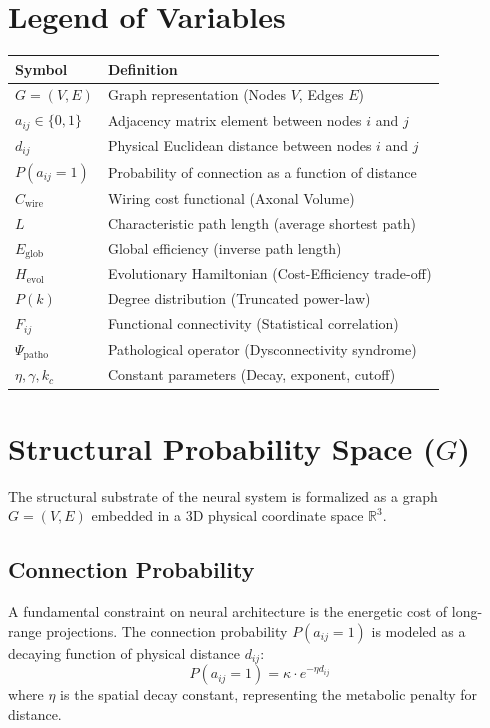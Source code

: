\documentclass[11pt,fleqn]{article}
\begin{document}
\section{Legend of Variables}
\begin{table}[H]
\centering
\begin{tabular}{ll}
\toprule
\textbf{Symbol} & \textbf{Definition} \\
\midrule
$G = (V, E)$ & Graph representation (Nodes $V$, Edges $E$) \\
$a_{ij} \in \{0, 1\}$ & Adjacency matrix element between nodes $i$ and $j$ \\
$d_{ij}$ & Physical Euclidean distance between nodes $i$ and $j$ \\
$P(a_{ij}=1)$ & Probability of connection as a function of distance \\
$C_{\text{wire}}$ & Wiring cost functional (Axonal Volume) \\
$L$ & Characteristic path length (average shortest path) \\
$E_{\text{glob}}$ & Global efficiency (inverse path length) \\
$H_{\text{evol}}$ & Evolutionary Hamiltonian (Cost-Efficiency trade-off) \\
$P(k)$ & Degree distribution (Truncated power-law) \\
$F_{ij}$ & Functional connectivity (Statistical correlation) \\
$\Psi_{\text{patho}}$ & Pathological operator (Dysconnectivity syndrome) \\
$\eta, \gamma, k_c$ & Constant parameters (Decay, exponent, cutoff) \\
\bottomrule
\end{tabular}
\end{table}

\section{Structural Probability Space ($G$)}
The structural substrate of the neural system is formalized as a graph $G = (V, E)$ embedded in a 3D physical coordinate space $\mathbb{R}^3$.

\subsection{Connection Probability}
A fundamental constraint on neural architecture is the energetic cost of long-range projections. The connection probability $P(a_{ij}=1)$ is modeled as a decaying function of physical distance $d_{ij}$:
\begin{equation}
    P(a_{ij} = 1) = \kappa \cdot e^{-\eta d_{ij}}
\end{equation}
where $\eta$ is the spatial decay constant, representing the metabolic penalty for distance.
\end{document}
